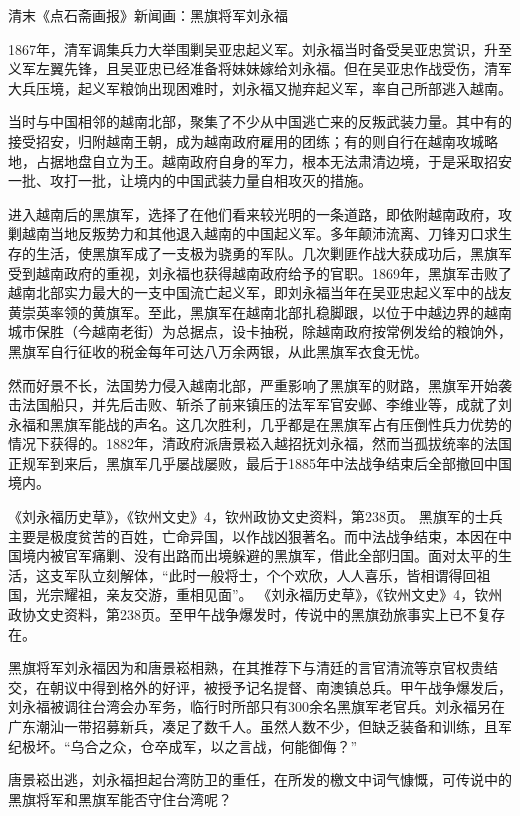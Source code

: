 \documentclass[12pt,UTF8]{ctexbook}
\begin{document}
清末《点石斋画报》新闻画：黑旗将军刘永福

1867年，清军调集兵力大举围剿吴亚忠起义军。刘永福当时备受吴亚忠赏识，升至义军左翼先锋，且吴亚忠已经准备将妹妹嫁给刘永福。但在吴亚忠作战受伤，清军大兵压境，起义军粮饷出现困难时，刘永福又抛弃起义军，率自己所部逃入越南。

当时与中国相邻的越南北部，聚集了不少从中国逃亡来的反叛武装力量。其中有的接受招安，归附越南王朝，成为越南政府雇用的团练；有的则自行在越南攻城略地，占据地盘自立为王。越南政府自身的军力，根本无法肃清边境，于是采取招安一批、攻打一批，让境内的中国武装力量自相攻灭的措施。

进入越南后的黑旗军，选择了在他们看来较光明的一条道路，即依附越南政府，攻剿越南当地反叛势力和其他退入越南的中国起义军。多年颠沛流离、刀锋刃口求生存的生活，使黑旗军成了一支极为骁勇的军队。几次剿匪作战大获成功后，黑旗军受到越南政府的重视，刘永福也获得越南政府给予的官职。1869年，黑旗军击败了越南北部实力最大的一支中国流亡起义军，即刘永福当年在吴亚忠起义军中的战友黄崇英率领的黄旗军。至此，黑旗军在越南北部扎稳脚跟，以位于中越边界的越南城市保胜（今越南老街）为总据点，设卡抽税，除越南政府按常例发给的粮饷外，黑旗军自行征收的税金每年可达八万余两银，从此黑旗军衣食无忧。

然而好景不长，法国势力侵入越南北部，严重影响了黑旗军的财路，黑旗军开始袭击法国船只，并先后击败、斩杀了前来镇压的法军军官安邺、李维业等，成就了刘永福和黑旗军能战的声名。这几次胜利，几乎都是在黑旗军占有压倒性兵力优势的情况下获得的。1882年，清政府派唐景崧入越招抚刘永福，然而当孤拔统率的法国正规军到来后，黑旗军几乎屡战屡败，最后于1885年中法战争结束后全部撤回中国境内。

《刘永福历史草》，《钦州文史》4，钦州政协文史资料，第238页。
黑旗军的士兵主要是极度贫苦的百姓，亡命异国，以作战凶狠著名。而中法战争结束，本因在中国境内被官军痛剿、没有出路而出境躲避的黑旗军，借此全部归国。面对太平的生活，这支军队立刻解体，“此时一般将士，个个欢欣，人人喜乐，皆相谓得回祖国，光宗耀祖，亲友交游，重相见面”。 《刘永福历史草》，《钦州文史》4，钦州政协文史资料，第238页。至甲午战争爆发时，传说中的黑旗劲旅事实上已不复存在。

黑旗将军刘永福因为和唐景崧相熟，在其推荐下与清廷的言官清流等京官权贵结交，在朝议中得到格外的好评，被授予记名提督、南澳镇总兵。甲午战争爆发后，刘永福被调往台湾会办军务，临行时所部只有300余名黑旗军老官兵。刘永福另在广东潮汕一带招募新兵，凑足了数千人。虽然人数不少，但缺乏装备和训练，且军纪极坏。“乌合之众，仓卒成军，以之言战，何能御侮？”

唐景崧出逃，刘永福担起台湾防卫的重任，在所发的檄文中词气慷慨，可传说中的黑旗将军和黑旗军能否守住台湾呢？
\end{document}
